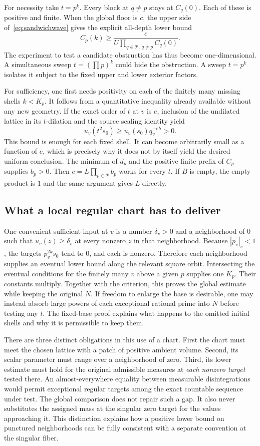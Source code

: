 \documentclass[12pt,letterpaper]{article}
\begin{document}
For necessity take $t=p^k$. Every block at $q\neq p$ stays at $C_q(0)$. Each of these is positive and finite. When the global floor is $c$, the upper side of~\eqref{eq:sandwichwave} gives the explicit all-depth lower bound
\[
 C_p(k)\geq\frac{c}{U\prod_{q\in\mathcal P,\ q\ne p} C_q(0)}.
\]
The experiment to test a candidate obstruction has thus become one-dimensional. A simultaneous sweep $t=(\prod p)^k$ could hide the obstruction. A sweep $t=p^k$ isolates it subject to the fixed upper and lower exterior factors.

For sufficiency, one first needs positivity on each of the finitely many missing shells $k<K_p$. It follows from a quantitative inequality already available without any new geometry. If the exact order of $t$ at $v$ is $e$, inclusion of the undilated lattice in its $t$-dilation and the source scaling identity yield
\[
 u_v(t^2s_0)\geq u_v(s_0) q_v^{-eh}>0.
\]
This bound is enough for each fixed shell. It can become arbitrarily small as a function of $e$, which is precisely why it does not by itself yield the desired uniform conclusion. The minimum of $d_p$ and the positive finite prefix of $C_p$ supplies $b_p>0$. Then $c=L\prod_{p\in\mathcal P}b_p$ works for every $t$. If $B$ is empty, the empty product is $1$ and the same argument gives $L$ directly.

\subsection{What a local regular chart has to deliver}

One convenient sufficient input at $v$ is a number $\delta_v>0$ and a neighborhood of $0$ such that $u_v(z)\geq\delta_v$ at every nonzero $z$ in that neighborhood. Because $|p_v|_v<1$, the targets $p_v^{2k}s_0$ tend to $0$, and each is nonzero. Therefore each neighborhood supplies an eventual lower bound along the relevant square orbit. Intersecting the eventual conditions for the finitely many $v$ above a given $p$ supplies one $K_p$. Their constants multiply. Together with the criterion, this proves the global estimate while keeping the original $N$. If freedom to enlarge the base is desirable, one may instead absorb large powers of each exceptional rational prime into $N$ before testing any $t$. The fixed-base proof explains what happens to the omitted initial shells and why it is permissible to keep them.

There are three distinct obligations in this use of a chart. First the chart must meet the chosen lattice with a patch of positive ambient volume. Second, its scalar parameter must range over a neighborhood of zero. Third, its lower estimate must hold for the original admissible measures at \emph{each nonzero target} tested there. An almost-everywhere equality between measurable disintegrations would permit exceptional regular targets among the exact countable sequence under test. The global comparison does not repair such a gap. It also never substitutes the assigned mass at the singular zero target for the values approaching it. This distinction explains how a positive lower bound on punctured neighborhoods can be fully consistent with a separate convention at the singular fiber.
\end{document}
